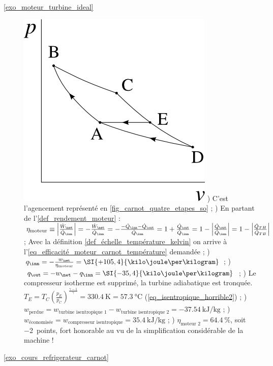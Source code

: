 \begin{description}
		\item [\ref{exo_moteur_turbine_ideal}]
					\includegraphics[width=\solutiondiagramwidth]{images/exo_sol_pv_carnot_turbine.png}
					) C’est l’agencement représenté en \cref{fig_carnot_quatre_etapes_so} ;
					) En partant de l’\cref{def_rendement_moteur}  : $\eta_\text{moteur}
						\equiv \left| \frac{\dot W_\net}{\dot Q_\inn} \right|
						= - \frac{\dot W_\net}{\dot Q_\inn}
						= - \frac{-\dot Q_\inn - \dot Q_\out}{\dot Q_\inn}
						= 1 + \frac{\dot Q_\out}{\dot Q_\inn}
						= 1 - \left|\frac{\dot Q_\out}{\dot Q_\inn}\right|
						= 1 - \left|\frac{\dot Q_{TH}}{\dot Q_{TB}}\right|$ ; Avec la définition \ref{def_échelle_température_kelvin} on arrive à l’\cref{eq_efficacité_moteur_carnot_température} demandée ;
					) ${q}_\inn = -\frac{w_\net}{\eta_\text{moteur}} = \SI{+105,4}{\kilo\joule\per\kilogram}$ ;
					) ${q}_\out = -w_\net - q_\inn = \SI{-35,4}{\kilo\joule\per\kilogram}$ ;
					) Le compresseur isotherme est supprimé, la turbine adiabatique est tronquée. $T_E = T_C \left(\frac{p_E}{p_C}\right)^\frac{\gamma - 1}{\gamma} = \SI{330,4}{\kelvin} = \SI{57,3}{\degreeCelsius}$ (\ref{eq_isentropique_horrible2}) ;
					) $w_\text{perdue} = w_\text{turbine isentropique 1} - w_\text{turbine isentropique 2} = \SI{-37,54}{\kilo\joule\per\kilogram}$ ;
					) $w_\text{économisée} = w_\text{compresseur isentropique} = \SI{+35,4}{\kilo\joule\per\kilogram}$ ;
					) $\eta_\text{moteur 2} = \SI{64,4}{\percent}$, soit \SI{-2}{points}, fort honorable au vu de la simplification considérable de la machine !
		\item [\ref{exo_cours_refrigerateur_carnot}]

\end{description}
